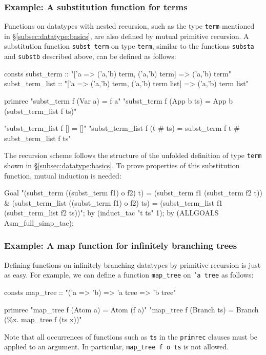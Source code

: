 \subsubsection{Example: A substitution function for terms}
Functions on datatypes with nested recursion, such as the type
\texttt{term} mentioned in {\S}\ref{subsec:datatype:basics}, are
also defined by mutual primitive recursion. A substitution
function \texttt{subst_term} on type \texttt{term}, similar to the functions
\texttt{substa} and \texttt{substb} described above, can
be defined as follows:
\begin{ttbox}
consts
  subst_term :: "['a => ('a,'b) term, ('a,'b) term] => ('a,'b) term"
  subst_term_list ::
    "['a => ('a,'b) term, ('a,'b) term list] => ('a,'b) term list"

primrec
  "subst_term f (Var a) = f a"
  "subst_term f (App b ts) = App b (subst_term_list f ts)"

  "subst_term_list f [] = []"
  "subst_term_list f (t # ts) =
     subst_term f t # subst_term_list f ts"
\end{ttbox}
The recursion scheme follows the structure of the unfolded definition of type
\texttt{term} shown in {\S}\ref{subsec:datatype:basics}. To prove properties of
this substitution function, mutual induction is needed:
\begin{ttbox}
Goal
  "(subst_term ((subst_term f1) o f2) t) =
     (subst_term f1 (subst_term f2 t)) &
   (subst_term_list ((subst_term f1) o f2) ts) =
     (subst_term_list f1 (subst_term_list f2 ts))";
by (induct_tac "t ts" 1);
by (ALLGOALS Asm_full_simp_tac);
\end{ttbox}

\subsubsection{Example: A map function for infinitely branching trees}
Defining functions on infinitely branching datatypes by primitive
recursion is just as easy. For example, we can define a function
\texttt{map_tree} on \texttt{'a tree} as follows:
\begin{ttbox}
consts
  map_tree :: "('a => 'b) => 'a tree => 'b tree"

primrec
  "map_tree f (Atom a) = Atom (f a)"
  "map_tree f (Branch ts) = Branch (\%x. map_tree f (ts x))"
\end{ttbox}
Note that all occurrences of functions such as \texttt{ts} in the
\texttt{primrec} clauses must be applied to an argument. In particular,
\texttt{map_tree f o ts} is not allowed.

